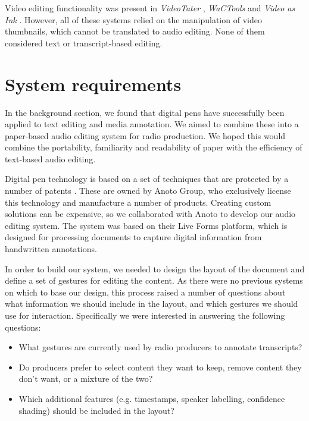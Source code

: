 Video editing functionality was present in \textit{VideoTater} \citep{Diakopoulos2006}, \textit{WaCTools}
\citep{Cattelan2008} and \textit{Video as Ink} \citep{Cabral2016}. However, all of these systems relied on the
manipulation of video thumbnails, which cannot be translated to audio editing. None of them considered text or
transcript-based editing.



\section{System requirements}\label{sec:paper-requirements}

In the background section, we found that digital pens have successfully been applied to text editing and media
annotation. We aimed to combine these into a paper-based audio editing system for radio production. We hoped this
would combine the portability, familiarity and readability of paper with the efficiency of text-based audio editing. 

Digital pen technology is based on a set of techniques that are protected by a number of patents \citep{Fahraeus2003}.
These are owned by Anoto Group, who exclusively license this technology and manufacture a number of products. Creating
custom solutions can be expensive, so we collaborated with Anoto to develop our audio editing system. The system was
based on their Live Forms platform, which is designed for processing documents to capture digital information from
handwritten annotations.

In order to build our system, we needed to design the layout of the document and define a set of gestures for
editing the content.  As there were no previous systems on which to base our design, this process raised a number of
questions about what information we should include in the layout, and which gestures we should use for interaction.
Specifically we were interested in answering the following questions:

{\singlespacing
  \begin{itemize}
    \item What gestures are currently used by radio producers to annotate transcripts?
    \item Do producers prefer to select content they want to keep, remove content they don't want, or a mixture of the
      two?
    \item Which additional features (e.g. timestamps, speaker labelling, confidence shading) should be included in the
      layout?
  \end{itemize}
}

